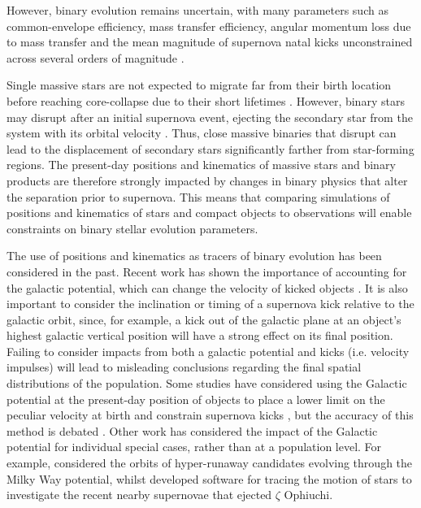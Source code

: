 \documentclass[twocolumn, twocolappendix, oneside]{aastex631}
\begin{document}
However, binary evolution remains uncertain, with many parameters such as common-envelope efficiency, mass transfer efficiency, angular momentum loss due to mass transfer and the mean magnitude of supernova natal kicks unconstrained across several orders of magnitude \citep[e.g.,][]{Janka+2012:2012ARNPS..62..407J,Ivanova+2013, Katsuda+2018,Ivanova+2020:2020cee..book.....I,Ropke+2023:2023LRCA....9....2R, Marchant2023}.

Single massive stars are not expected to migrate far from their birth location before reaching core-collapse due to their short lifetimes \citep[$\lesssim50$\,Myr, e.g., ][]{zapartas:17}. However, binary stars may disrupt after an initial supernova event, ejecting the secondary star from the system with its orbital velocity \citep[e.g.,][]{Blaauw+1961,Eldridge+2011:2011MNRAS.414.3501E,Renzo+2019:2019A&A...624A..66R}. Thus, close massive binaries that disrupt can lead to the displacement of secondary stars significantly farther from star-forming regions. The present-day positions and kinematics of massive stars and binary products are therefore strongly impacted by changes in binary physics that alter the separation prior to supernova. This means that comparing simulations of positions and kinematics of stars and compact objects to observations will enable constraints on binary stellar evolution parameters.

The use of positions and kinematics as tracers of binary evolution has been considered in the past. Recent work has shown the importance of accounting for the galactic potential, which can change the velocity of kicked objects \citep[e.g.,][]{Disberg+2024:2024A&A...687A.272D}. It is also important to consider the inclination or timing of a supernova kick relative to the galactic orbit, since, for example, a kick out of the galactic plane at an object's highest galactic vertical position will have a strong effect on its final position. Failing to consider impacts from both a galactic potential and kicks (i.e. velocity impulses) will lead to misleading conclusions regarding the final spatial distributions of the population. Some studies have considered using the Galactic potential at the present-day position of objects to place a lower limit on the peculiar velocity at birth and constrain supernova kicks \citep{Repetto+2012:2012MNRAS.425.2799R, Repetto+2015:2015MNRAS.453.3341R, Repetto+2017:2017MNRAS.467..298R, atri:19}, but the accuracy of this method is debated \citep{Mandel+2016:2016MNRAS.456..578M}. Other work has considered the impact of the Galactic potential for individual special cases, rather than at a population level. For example, \citet{Evans+2020:2020MNRAS.497.5344E} considered the orbits of hyper-runaway candidates evolving through the Milky Way potential, whilst \citet{Neuhauser+2020:2020MNRAS.498..899N} developed software for tracing the motion of stars to investigate the recent nearby supernovae that ejected $\zeta$ Ophiuchi.
\end{document}
